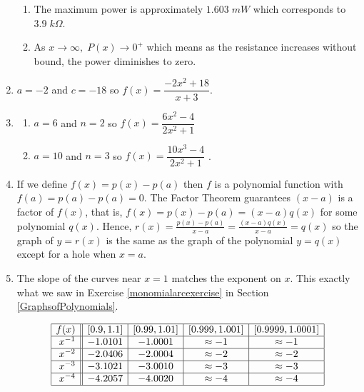 \documentclass{ximera}
\begin{document}
\begin{enumerate}
\begin{enumerate}
\item The maximum power is approximately $1.603 \; mW$ which corresponds to $3.9 \; k\Omega$.

\item As $x \rightarrow \infty, \; P(x) \rightarrow 0^{+}$ which means as the resistance increases without bound, the power diminishes to zero.

\end{enumerate}

\item  $a = -2$ and $c = -18$ so $f(x) = \dfrac{-2x^2+18}{x+3}$.

\item  \begin{multicols}{2}

 \begin{enumerate}

\item   $a=6$ and $n=2$ so $f(x) = \dfrac{6x^{2} -4}{2x^2+1}$

\item  $a=10$ and $n = 3$ so $f(x) = \dfrac{10x^{3} -4}{2x^2+1}$ .

\end{enumerate}
\end{multicols}


\item  If we define $f(x) = p(x) - p(a)$ then $f$ is a polynomial function with $f(a) = p(a) - p(a) = 0$.  The Factor Theorem guarantees $(x-a)$ is a factor of $f(x)$, that is, $f(x) = p(x) - p(a) = (x-a)q(x)$ for some polynomial $q(x)$. Hence, $r(x) = \frac{p(x)-p(a)}{x-a} = \frac{(x-a)q(x)}{x-a} = q(x)$ so the graph of $y = r(x)$ is the same as the graph of the polynomial $y = q(x)$ except for a hole when $x = a$.

\item  The slope of the curves near $x=1$ matches the exponent on $x$.  This exactly what we saw in  Exercise \ref{monomialarcexercise} in Section \ref{GraphsofPolynomials}.

\[ \begin{array}{|r||c|c|c|c|}  \hline

 f(x) &  [0.9, 1.1] & [0.99, 1.01] &[0.999, 1.001] & [0.9999, 1.0001]  \\ \hline
 x^{-1} & -1.0101 & -1.0001 & \approx -1 & \approx -1  \\  \hline
 x^{-2}& -2.0406& -2.0004 & \approx -2 & \approx -2   \\  \hline
 x^{-3} &-3.1021 & -3.0010 & \approx -3 & \approx -3   \\  \hline
 x^{-4} &-4.2057 & -4.0020 &\approx -4 & \approx -4   \\   \hline


\end{array} \]

\end{enumerate} 
\end{document}

